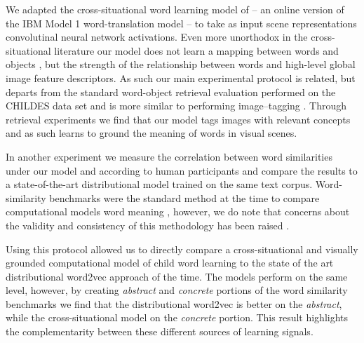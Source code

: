 We adapted the cross-situational word learning model of \cite{fazly.etal.10} -- an 
online version of the IBM Model 1 word-translation model \citep{BrownPPM94} -- to take as input scene
representations convolutinal neural network activations.
Even more unorthodox in the cross-situational literature our model does not learn a mapping between 
words and objects 
\citep{fazly.etal.10,lazaridou2016multimodal}, but the strength of the relationship between words and high-level
global image feature descriptors. As such our main experimental protocol is related, but departs from
the standard word-object retrieval evaluation performed on the CHILDES data set \citep{goodman2008bayesian,kievit2013naturalistic,lazaridou2016multimodal} and is more similar
to performing image--tagging \citep{weston2010large}. Through retrieval experiments we find that
our model tags images with relevant concepts and as such learns to ground the meaning of words in visual
scenes.

In another experiment we measure the
correlation between word similarities under our model and according to human participants and compare
the results to a state-of-the-art distributional model trained on the same text corpus.
Word-similarity benchmarks were the standard method at the time to compare
computational models word meaning \citep{faruqui2014community}, however,
we do note that concerns about the validity and consistency of this methodology has been 
raised \citep{faruqui2016problems}.

Using this protocol allowed us to directly compare a cross-situational and visually grounded computational
model of child word learning to the state of the art distributional word2vec approach of the time. 
The models perform on the same level, however, by creating
\emph{abstract} and  \emph{concrete} portions of the word similarity benchmarks we find that
the distributional word2vec is better on the \emph{abstract}, while the cross-situational model on the 
\emph{concrete} portion. This result highlights the complementarity
between these different sources of learning signals.



